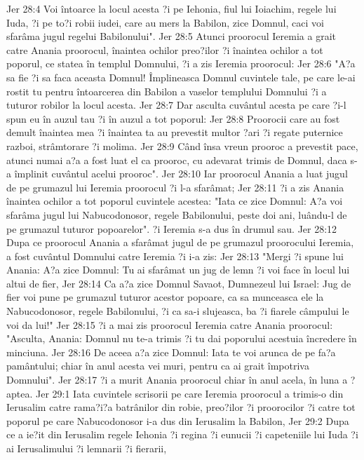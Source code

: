 Jer 28:4  Voi întoarce la locul acesta ?i pe Iehonia, fiul lui Ioiachim, regele lui Iuda, ?i pe to?i robii iudei, care au mers la Babilon, zice Domnul, caci voi sfarâma jugul regelui Babilonului".
Jer 28:5  Atunci proorocul Ieremia a grait catre Anania proorocul, înaintea ochilor preo?ilor ?i înaintea ochilor a tot poporul, ce statea în templul Domnului, ?i a zis Ieremia proorocul:
Jer 28:6  "A?a sa fie ?i sa faca aceasta Domnul! Împlineasca Domnul cuvintele tale, pe care le-ai rostit tu pentru întoarcerea din Babilon a vaselor templului Domnului ?i a tuturor robilor la locul acesta.
Jer 28:7  Dar asculta cuvântul acesta pe care ?i-l spun eu în auzul tau ?i în auzul a tot poporul:
Jer 28:8  Proorocii care au fost demult înaintea mea ?i înaintea ta au prevestit multor ?ari ?i regate puternice razboi, strâmtorare ?i molima.
Jer 28:9  Când însa vreun prooroc a prevestit pace, atunci numai a?a a fost luat el ca prooroc, cu adevarat trimis de Domnul, daca s-a împlinit cuvântul acelui prooroc".
Jer 28:10  Iar proorocul Anania a luat jugul de pe grumazul lui Ieremia proorocul ?i l-a sfarâmat;
Jer 28:11  ?i a zis Anania înaintea ochilor a tot poporul cuvintele acestea: "Iata ce zice Domnul: A?a voi sfarâma jugul lui Nabucodonosor, regele Babilonului, peste doi ani, luându-l de pe grumazul tuturor popoarelor". ?i Ieremia s-a dus în drumul sau.
Jer 28:12  Dupa ce proorocul Anania a sfarâmat jugul de pe grumazul proorocului Ieremia, a fost cuvântul Domnului catre Ieremia ?i i-a zis:
Jer 28:13  "Mergi ?i spune lui Anania: A?a zice Domnul: Tu ai sfarâmat un jug de lemn ?i voi face în locul lui altui de fier,
Jer 28:14  Ca a?a zice Domnul Savaot, Dumnezeul lui Israel: Jug de fier voi pune pe grumazul tuturor acestor popoare, ca sa munceasca ele la Nabucodonosor, regele Babilonului, ?i ca sa-i slujeasca, ba ?i fiarele câmpului le voi da lui!"
Jer 28:15  ?i a mai zis proorocul Ieremia catre Anania proorocul: "Asculta, Anania: Domnul nu te-a trimis ?i tu dai poporului acestuia încredere în minciuna.
Jer 28:16  De aceea a?a zice Domnul: Iata te voi arunca de pe fa?a pamântului; chiar în anul acesta vei muri, pentru ca ai grait împotriva Domnului".
Jer 28:17  ?i a murit Anania proorocul chiar în anul acela, în luna a ?aptea.
Jer 29:1  Iata cuvintele scrisorii pe care Ieremia proorocul a trimis-o din Ierusalim catre rama?i?a batrânilor din robie, preo?ilor ?i proorocilor ?i catre tot poporul pe care Nabucodonosor i-a dus din Ierusalim la Babilon,
Jer 29:2  Dupa ce a ie?it din Ierusalim regele Iehonia ?i regina ?i eunucii ?i capeteniile lui Iuda ?i ai Ierusalimului ?i lemnarii ?i fierarii,
